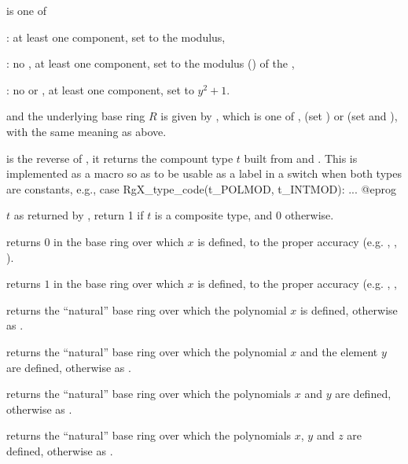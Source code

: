
 is one of

: at least one  component,
set  to the modulus,

: no , at least one  component,
set  to the modulus () of the ,

: no  or , at least one 
component, set  to $y^2 + 1$.

and the underlying base ring $R$ is given by , which
is one of ,  (set ) or 
(set  and ), with the same meaning
as above.

 is the reverse of
, it returns the compount type $t$ built from
 and . This is implemented as a macro so as to be usable
as a label in a switch when both types are constants, e.g.,
\bprog
  case RgX_type_code(t_POLMOD, t_INTMOD): ...
@eprog

 $t$ as returned by ,
return 1 if $t$ is a composite type, and 0 otherwise.

 returns $0$ in the base ring over which $x$
is defined, to the proper accuracy (e.g. , ,
).

 returns $1$ in the base ring over which $x$
is defined, to the proper accuracy (e.g. , ,

 returns
the ``natural'' base ring over which the polynomial $x$ is defined,
otherwise as .

returns the ``natural'' base ring over which the polynomial $x$ and the element
$y$ are defined, otherwise as .

 returns
the ``natural'' base ring over which the polynomials $x$ and $y$ are defined,
otherwise as .

returns the ``natural'' base ring over which the polynomials $x$, $y$ and $z$
are defined, otherwise as .

